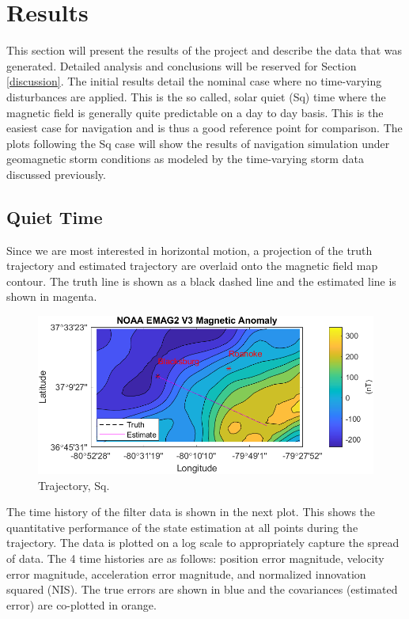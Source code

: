 \documentclass[conf]{new-aiaa}
\begin{document}
\section{Results} %

This section will present the results of the project and describe the data that was generated. Detailed  analysis and conclusions will be reserved for Section \ref{discussion}. The initial results detail the nominal case where no time-varying disturbances are applied. This is the so called, solar quiet (Sq) time where the magnetic field is generally quite predictable on a day to day basis. This is the easiest case for navigation and is thus a good reference point for comparison. The plots following the Sq case will show the results of navigation simulation under geomagnetic storm conditions as modeled by the time-varying storm data discussed previously.

\subsection{Quiet Time} %

Since we are most interested in horizontal motion, a projection of the truth trajectory and estimated trajectory are overlaid onto the magnetic field map contour. The truth line is shown as a black dashed line and the estimated line is shown in magenta.

\begin{figure}[H]
\centering
\includegraphics[width=1.0\textwidth]{figures/trajectory_quiet.png}
\caption{Trajectory, Sq.}
\end{figure}

The time history of the filter data is shown in the next plot. This shows the quantitative performance of the state estimation at all points during the trajectory. The data is plotted on a log scale to appropriately capture the spread of data. The 4 time histories are as follows: position error magnitude, velocity error magnitude, acceleration error magnitude, and normalized innovation squared (NIS). The true errors are shown in blue and the covariances (estimated error) are co-plotted in orange.
\end{document}
